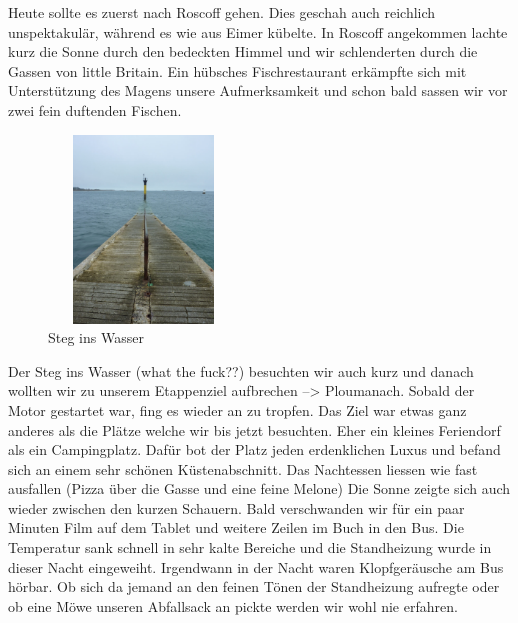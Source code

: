Heute sollte es zuerst nach Roscoff gehen.
Dies geschah auch reichlich unspektakulär, während es wie aus Eimer kübelte.
In Roscoff angekommen lachte kurz die Sonne durch den bedeckten Himmel und wir schlenderten durch die Gassen von little Britain.
Ein hübsches Fischrestaurant erkämpfte sich mit Unterstützung des Magens unsere Aufmerksamkeit und schon bald sassen wir vor zwei fein duftenden Fischen.

\begin{figure} 
  \begin{centering}
    \includegraphics[width=0.45\textwidth, height=5cm, keepaspectratio]{../Bilder/Bretagne/68.jpg}
    \caption{Steg ins Wasser}
  \end{centering}
\end{figure} 

Der Steg ins Wasser (what the fuck??) besuchten wir auch kurz und danach wollten wir zu unserem Etappenziel aufbrechen --> Ploumanach.
Sobald der Motor gestartet war, fing es wieder an zu tropfen.
Das Ziel war etwas ganz anderes als die Plätze welche wir bis jetzt besuchten.
Eher ein kleines Feriendorf als ein Campingplatz.
Dafür bot der Platz jeden erdenklichen Luxus und befand sich an einem sehr schönen Küstenabschnitt.
Das Nachtessen liessen wie fast ausfallen (Pizza über die Gasse und eine feine Melone) Die Sonne zeigte sich auch wieder zwischen den kurzen Schauern.
Bald verschwanden wir für ein paar Minuten Film auf dem Tablet und weitere Zeilen im Buch in den Bus.
Die Temperatur sank schnell in sehr kalte Bereiche und die Standheizung wurde in dieser Nacht eingeweiht.
Irgendwann in der Nacht waren Klopfgeräusche am Bus hörbar.
Ob sich da jemand an den feinen Tönen der Standheizung aufregte oder ob eine Möwe unseren Abfallsack an pickte werden wir wohl nie erfahren.

